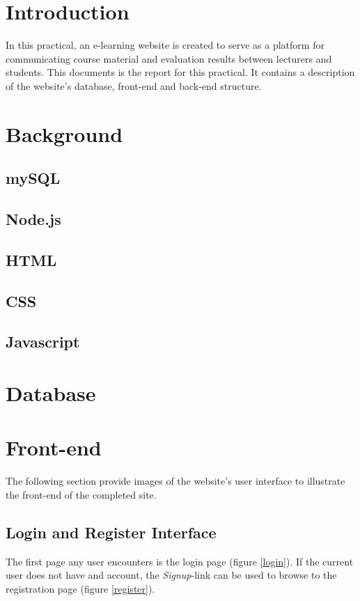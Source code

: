 \documentclass[a4paper,12pt]{article}
\numberwithin{equation}{section} %
\numberwithin{figure}{section}
\begin{document}
\section{Introduction}
In this practical, an e-learning website is created to serve as a platform for communicating course material and evaluation results between lecturers and students. This documents is the report for this practical. It contains a description of the website's database, front-end and back-end structure.


\section{Background}

\subsection{mySQL}

\subsection{Node.js}

\subsection{HTML}

\subsection{CSS}

\subsection{Javascript}

\section{Database}

\section{Front-end}
The following section provide images of the website's user interface to illustrate the front-end of the completed site.
\subsection{Login and Register Interface}
The first page any user encounters is the login page (figure \ref{login}). If the current user does not have and account, the \textit{Signup}-link can be used to browse to the registration page (figure \ref{register}).
\end{document}
